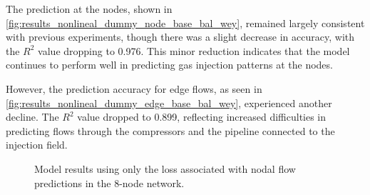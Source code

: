 The prediction at the nodes, shown in \cref{fig:results_nonlineal_dummy_node_base_bal_wey}, remained largely consistent with previous experiments, though there was a slight decrease in accuracy, with the $R^2$ value dropping to 0.976. This minor reduction indicates that the model continues to perform well in predicting gas injection patterns at the nodes.

However, the prediction accuracy for edge flows, as seen in \cref{fig:results_nonlineal_dummy_edge_base_bal_wey}, experienced another decline. The $R^2$ value dropped to 0.899, reflecting increased difficulties in predicting flows through the compressors and the pipeline connected to the injection field. 


\begin{figure}
    \centering
    \setlength{}        
    \setlength{} 
    
    \caption{Model results using only the loss associated with nodal flow predictions in the 8-node network.}
    \label{fig:dummy_base_results}
\end{figure}





